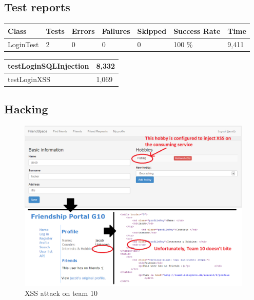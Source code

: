 \documentclass[a4paper]{article}
\begin{document}
\subsection{Test reports}
\begin{table}[h!]
\begin{tabular}{| l | l | l | l | l | l | l |}
\hline
Class & Tests & Errors & Failures & Skipped & Success Rate & Time \\ \hline
LoginTest & 2 & 0 & 0 & 0 & 100 \% & 9,411 \\ \hline
\end{tabular}
\end{table}
\begin{table}[h!]
\begin{tabular}{| l | l |}
\hline
testLoginSQLInjection & 8,332 \\ \hline
testLoginXSS & 1,069 \\ \hline
\end{tabular}
\end{table}

\subsection{Hacking}
\begin{figure}[h!]
\centering
\includegraphics[scale=0.3]{Team10_XSS}
\caption{XSS attack on team 10}
\label{fig:xss_screencap}
\end{figure}


\end{document}
